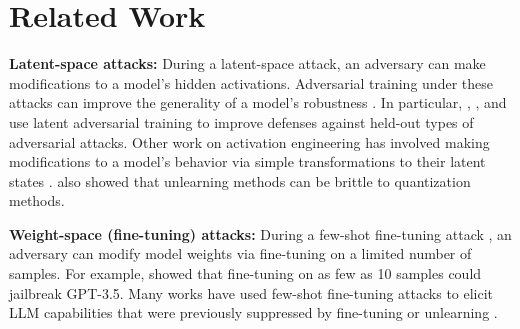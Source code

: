 \section{Related Work}
\textbf{Latent-space attacks:} 
During a latent-space attack, an adversary can make modifications to a model's hidden activations.
Adversarial training under these attacks can improve the generality of a model's robustness \citep{sankaranarayanan2018regularizing, singh2019harnessing, zhang2023adversarial, schwinn2023adversarial, zeng2024beear}.
In particular, \citet{xhonneux2024efficient}, \citet{casper2024defending}, and \citet{sheshadri2024targeted} use latent adversarial training to improve defenses against held-out types of adversarial attacks. 
Other work on activation engineering has involved making modifications to a model's behavior via simple transformations to their latent states \citep{zou2023representation, wang2023backdoor, lu2024investigating, arditi2024refusal}. \citet{zhang2025catastrophicfailurellmunlearning} also showed that unlearning methods can be brittle to quantization methods. 

\textbf{Weight-space (fine-tuning) attacks:} During a few-shot fine-tuning attack \citep{huang2024harmful}, an adversary can modify model weights via fine-tuning on a limited number of samples. 
For example, \citet{qi2023fine} showed that fine-tuning on as few as 10 samples could jailbreak GPT-3.5.
Many works have used few-shot fine-tuning attacks to elicit LLM capabilities that were previously suppressed by fine-tuning or unlearning \citep{jain2023mechanistically, yang2023shadow, qi2023fine, bhardwaj2023language, lermen2023lora, zhan2023removing, ji2024language, qi2024safety, hu2024jogging, halawicovert, peng2024navigating, lo2024large, lucki2024adversarial, shumailov2024ununlearning, lynch2024eight, deeb2024unlearningmethodsremoveinformation, qi2024evaluating, yi2024vulnerability}.


